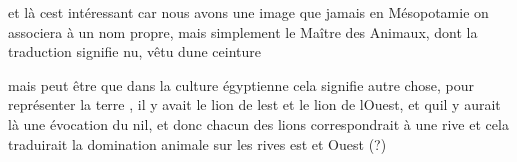\documentclass{article}
\begin{document}
et là c{\textquotesingle}est intéressant car nous avons une image que
jamais en  Mésopotamie on associera à un nom propre, mais simplement le
Maître des Animaux, dont la traduction signifie nu, vêtu
d{\textquotesingle}une ceinture 

mais peut être que dans la culture égyptienne cela signifie autre chose,
pour représenter la terre , il y avait le lion de
l{\textquotesingle}est et le lion de l{\textquotesingle}Ouest,  et
qu{\textquotesingle}il y aurait là une évocation du nil, et donc chacun
des lions correspondrait à une rive et cela traduirait la domination
animale sur les rives est et Ouest (?)
\end{document}
